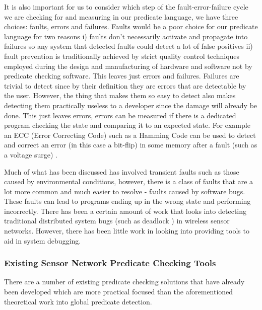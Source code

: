 It is also important for us to consider which step of the fault-error-failure cycle we are checking for and measuring in our predicate language, we have three choices: faults, errors and failures. Faults would be a poor choice for our predicate language for two reasons i) faults don't necessarily activate and propagate into failures so any system that detected faults could detect a lot of false positives ii) fault prevention is traditionally achieved by strict quality control techniques employed during the design and manufacturing of hardware and software\cite{dependability} not by predicate checking software. This leaves just errors and failures. Failures are trivial to detect since by their definition they are errors that are detectable by the user. However, the thing that makes them so easy to detect also makes detecting them practically useless to a developer since the damage will already be done. This just leaves errors, errors can be measured if there is a dedicated program checking the state and comparing it to an expected state. For example an ECC (Error Correcting Code) such as a Hamming Code can be used to detect and correct an error (in this case a bit-flip) in some memory after a fault (such as a voltage surge) \cite{hamming1950error}.

Much of what has been discussed has involved transient faults such as those caused by environmental conditions, however, there is a class of faults that are a lot more common and much easier to resolve - faults caused by software bugs. These faults can lead to programs ending up in the wrong state and performing incorrectly. There has been a certain amount of work that looks into detecting traditional distributed system bugs (such as deadlock \cite{5587352,5284172}) in wireless sensor networks. However, there has been little work in looking into providing tools to aid in system debugging.

\subsubsection{Existing Sensor Network Predicate Checking Tools}

There are a number of existing predicate checking solutions that have already been developed which are more practical focused than the aforementioned theoretical work into global predicate detection.

